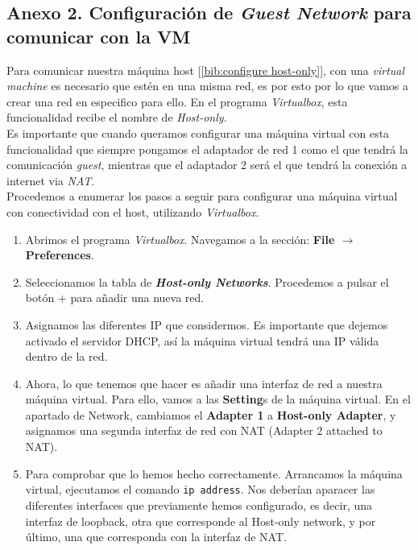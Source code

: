 \documentclass[12pt]{article}
\begin{document}
	\pagebreak
	
	\subsection*{Anexo 2. Configuración de \textit{Guest Network} para comunicar con la VM}
	\noindent Para comunicar nuestra máquina host [\ref{bib:configure host-only}], con una \textit{virtual machine} es necesario que estén en una misma red, es por esto por lo que vamos a crear una red en especifico para ello. En el programa \textit{Virtualbox}, esta funcionalidad recibe el nombre de \textit{Host-only}.\\
	
	\noindent Es importante que cuando queramos configurar una máquina virtual con esta funcionalidad que siempre pongamos el adaptador de red 1 como el que tendrá la comunicación \textit{guest}, mientras que el adaptador 2 será el que tendrá la conexión a internet via \textit{NAT}.\\
	
	\noindent Procedemos a enumerar los pasos a seguir para configurar una máquina virtual con conectividad con el host, utilizando \textit{Virtualbox}.
	
	\begin{enumerate}
		\item Abrimos el programa \textit{Virtualbox}. Navegamos a la sección: \textbf{File $\rightarrow$ Preferences}.
		\item Seleccionamos la tabla de \textbf{\textit{Host-only Networks}}. Procedemos a pulsar el botón + para añadir una nueva red.
		\item Asignamos las diferentes IP que considermos. Es importante que dejemos activado el servidor DHCP, así la máquina virtual tendrá una IP válida dentro de la red.
		\item Ahora, lo que tenemos que hacer es añadir una interfaz de red a nuestra máquina virtual. Para ello, vamos a las \textbf{Setting}s de la máquina virtual. En el apartado de Network, cambiamos el \textbf{Adapter 1} a\textbf{ Host-only Adapter}, y asignamos una segunda interfaz de red con NAT (Adapter 2 attached to NAT).
		\item Para comprobar que lo hemos hecho correctamente. Arrancamos la máquina virtual, ejecutamos el comando \texttt{ip address}. Nos deberían aparacer las diferentes interfaces que previamente hemos configurado, es decir, una interfaz de loopback, otra que corresponde al Host-only network, y por último, una que corresponda con la interfaz de NAT.
	\end{enumerate}
	
\end{document}

